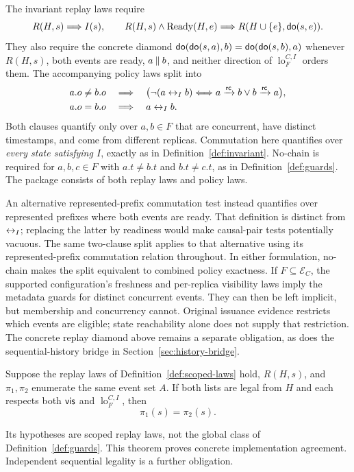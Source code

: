 \begin{definition}
\label{def:scoped-laws}
The invariant replay laws require
\[
 R(H,s)\Longrightarrow I(s),\qquad
 R(H,s)\land\operatorname{Ready}(H,e)
 \Longrightarrow R(H\cup\{e\},\mathsf{do}(s,e)).
\]
They also require the concrete diamond
$\mathsf{do}(\mathsf{do}(s,a),b)=\mathsf{do}(\mathsf{do}(s,b),a)$ whenever $R(H,s)$, both events are ready,
$a\mathbin{\|} b$, and neither direction of
$\operatorname{lo}^{C,I}_{F}$ orders them.
The accompanying policy laws split into
\begin{align*}
 a.o\ne b.o&\quad\Longrightarrow\quad
 \bigl(\neg(a\mathrel{\leftrightarrow_I} b)\Longleftrightarrow
 a\xrightarrow{\mathsf{rc}}b\lor b\xrightarrow{\mathsf{rc}}a\bigr),\\
 a.o=b.o&\quad\Longrightarrow\quad a\mathrel{\leftrightarrow_I}b.
\end{align*}
Both clauses quantify only over $a,b\in F$ that are concurrent, have distinct
timestamps, and come from different replicas. Commutation here quantifies over
\emph{every state satisfying $I$}, exactly as in
Definition~\ref{def:invariant}. No-chain is required for $a,b,c\in F$ with
$a.t\ne b.t$ and $b.t\ne c.t$, as in Definition~\ref{def:guards}.
The package consists of both replay laws and policy laws.
\end{definition}
An alternative represented-prefix commutation test instead quantifies over represented
prefixes where both events are ready. That definition is distinct from
$\mathrel{\leftrightarrow_I}$; replacing the latter by readiness would make causal-pair tests
potentially vacuous. The same two-clause split applies to that alternative
using its represented-prefix commutation relation throughout. In either
formulation, no-chain makes the split equivalent to combined policy exactness.
If $F\subseteq\mathcal E_C$, the supported configuration's freshness and
per-replica visibility laws imply the metadata guards for distinct concurrent
events. They can then be left implicit, but membership and concurrency cannot.
Original issuance evidence restricts which events are eligible; state
reachability alone does not supply that restriction. The concrete replay
diamond above remains a separate obligation, as does the sequential-history
bridge in Section~\ref{sec:history-bridge}.

\begin{theorem}
\label{thm:scoped-replay}
Suppose the replay laws of Definition~\ref{def:scoped-laws} hold,
$R(H,s)$, and $\pi_1,\pi_2$ enumerate the same event set $A$. If both lists are
legal from $H$ and each respects both $\mathsf{vis}$ and
$\operatorname{lo}^{C,I}_{F}$, then
\[
 \pi_1(s)=\pi_2(s).
\]
\end{theorem}
Its hypotheses are scoped replay laws, not the global class of
Definition~\ref{def:guards}. This theorem proves concrete implementation
agreement. Independent sequential legality is a further obligation.



